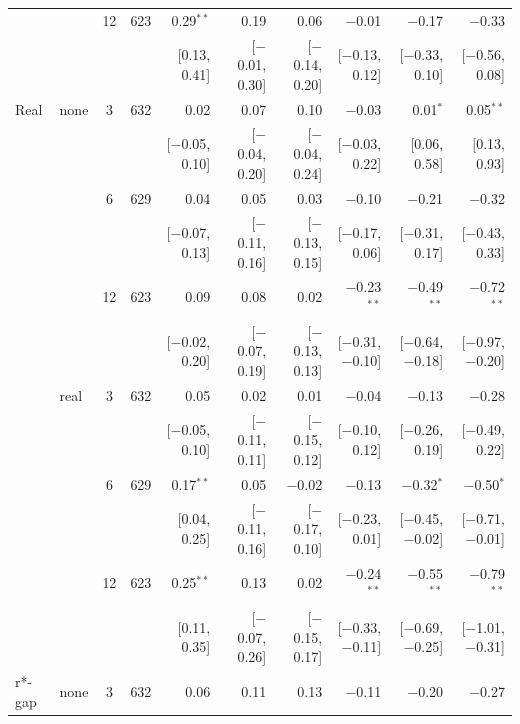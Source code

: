 \begin{longtable}{llcrrrrrrr}
 &  & 12 & 623 & 0.29$^{**}$ & 0.19 & 0.06 & $-$0.01 & $-$0.17 & $-$0.33\\
 & & & & {\scriptsize [0.13, 0.41]} & {\scriptsize [$-$0.01, 0.30]} & {\scriptsize [$-$0.14, 0.20]} & {\scriptsize [$-$0.13, 0.12]} & {\scriptsize [$-$0.33, 0.10]} & {\scriptsize [$-$0.56, 0.08]}\\
\addlinespace
Real & none & 3 & 632 & 0.02 & 0.07 & 0.10 & $-$0.03 & 0.01$^{*}$ & 0.05$^{**}$\\
 & & & & {\scriptsize [$-$0.05, 0.10]} & {\scriptsize [$-$0.04, 0.20]} & {\scriptsize [$-$0.04, 0.24]} & {\scriptsize [$-$0.03, 0.22]} & {\scriptsize [0.06, 0.58]} & {\scriptsize [0.13, 0.93]}\\
 &  & 6 & 629 & 0.04 & 0.05 & 0.03 & $-$0.10 & $-$0.21 & $-$0.32\\
 & & & & {\scriptsize [$-$0.07, 0.13]} & {\scriptsize [$-$0.11, 0.16]} & {\scriptsize [$-$0.13, 0.15]} & {\scriptsize [$-$0.17, 0.06]} & {\scriptsize [$-$0.31, 0.17]} & {\scriptsize [$-$0.43, 0.33]}\\
 &  & 12 & 623 & 0.09 & 0.08 & 0.02 & $-$0.23$^{**}$ & $-$0.49$^{**}$ & $-$0.72$^{**}$\\
 & & & & {\scriptsize [$-$0.02, 0.20]} & {\scriptsize [$-$0.07, 0.19]} & {\scriptsize [$-$0.13, 0.13]} & {\scriptsize [$-$0.31, $-$0.10]} & {\scriptsize [$-$0.64, $-$0.18]} & {\scriptsize [$-$0.97, $-$0.20]}\\
 & real & 3 & 632 & 0.05 & 0.02 & 0.01 & $-$0.04 & $-$0.13 & $-$0.28\\
 & & & & {\scriptsize [$-$0.05, 0.10]} & {\scriptsize [$-$0.11, 0.11]} & {\scriptsize [$-$0.15, 0.12]} & {\scriptsize [$-$0.10, 0.12]} & {\scriptsize [$-$0.26, 0.19]} & {\scriptsize [$-$0.49, 0.22]}\\
 &  & 6 & 629 & 0.17$^{**}$ & 0.05 & $-$0.02 & $-$0.13 & $-$0.32$^{*}$ & $-$0.50$^{*}$\\
 & & & & {\scriptsize [0.04, 0.25]} & {\scriptsize [$-$0.11, 0.16]} & {\scriptsize [$-$0.17, 0.10]} & {\scriptsize [$-$0.23, 0.01]} & {\scriptsize [$-$0.45, $-$0.02]} & {\scriptsize [$-$0.71, $-$0.01]}\\
 &  & 12 & 623 & 0.25$^{**}$ & 0.13 & 0.02 & $-$0.24$^{**}$ & $-$0.55$^{**}$ & $-$0.79$^{**}$\\
 & & & & {\scriptsize [0.11, 0.35]} & {\scriptsize [$-$0.07, 0.26]} & {\scriptsize [$-$0.15, 0.17]} & {\scriptsize [$-$0.33, $-$0.11]} & {\scriptsize [$-$0.69, $-$0.25]} & {\scriptsize [$-$1.01, $-$0.31]}\\
\addlinespace
r*-gap & none & 3 & 632 & 0.06 & 0.11 & 0.13 & $-$0.11 & $-$0.20 & $-$0.27\\

\end{longtable}
